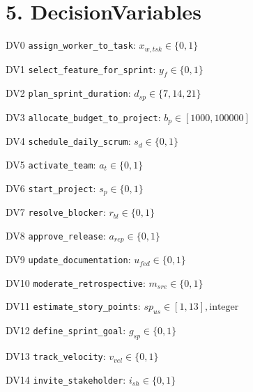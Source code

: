 \documentclass[12pt]{article}
\begin{document}
\section{5. DecisionVariables}
\item[DV0] \texttt{assign\_worker\_to\_task}: $x_{w,tsk} \in \{0,1\}$
    \item[DV1] \texttt{select\_feature\_for\_sprint}: $y_f \in \{0,1\}$
    \item[DV2] \texttt{plan\_sprint\_duration}: $d_{sp} \in \{7,14,21\}$
    \item[DV3] \texttt{allocate\_budget\_to\_project}: $b_p \in [1000, 100000]$
    \item[DV4] \texttt{schedule\_daily\_scrum}: $s_d \in \{0,1\}$
    \item[DV5] \texttt{activate\_team}: $a_t \in \{0,1\}$
    \item[DV6] \texttt{start\_project}: $s_p \in \{0,1\}$
    \item[DV7] \texttt{resolve\_blocker}: $r_{bl} \in \{0,1\}$
    \item[DV8] \texttt{approve\_release}: $a_{rep} \in \{0,1\}$
    \item[DV9] \texttt{update\_documentation}: $u_{fed} \in \{0,1\}$
    \item[DV10] \texttt{moderate\_retrospective}: $m_{sre} \in \{0,1\}$
    \item[DV11] \texttt{estimate\_story\_points}: $sp_{us} \in [1,13], \text{integer}$
    \item[DV12] \texttt{define\_sprint\_goal}: $g_{sp} \in \{0,1\}$
    \item[DV13] \texttt{track\_velocity}: $v_{vel} \in \{0,1\}$
    \item[DV14] \texttt{invite\_stakeholder}: $i_{sh} \in \{0,1\}$
\end{document}
